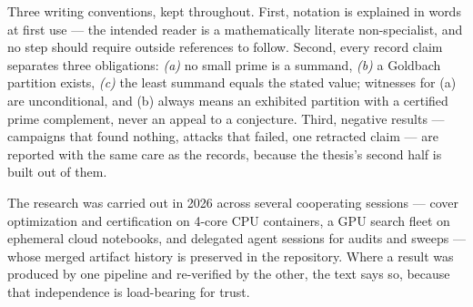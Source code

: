 \documentclass[11pt,oneside]{report}
\theoremstyle{plain}
\theoremstyle{definition}
\theoremstyle{remark}
\begin{document}
Three writing conventions, kept throughout. First, notation is explained
in words at first use --- the intended reader is a mathematically literate
non-specialist, and no step should require outside references to follow.
Second, every record claim separates three obligations: \emph{(a)} no
small prime is a summand, \emph{(b)} a Goldbach partition exists,
\emph{(c)} the least summand equals the stated value; witnesses for (a)
are unconditional, and (b) always means an exhibited partition with a
certified prime complement, never an appeal to a conjecture. Third,
negative results --- campaigns that found nothing, attacks that failed,
one retracted claim --- are reported with the same care as the records,
because the thesis's second half is built out of them.

The research was carried out in 2026 across several cooperating
sessions --- cover optimization and certification on 4-core CPU
containers, a GPU search fleet on ephemeral cloud notebooks, and
delegated agent sessions for audits and sweeps --- whose merged artifact
history is preserved in the repository. Where a result was produced by
one pipeline and re-verified by the other, the text says so, because that
independence is load-bearing for trust.

\tableofcontents










\appendix

\end{document}
